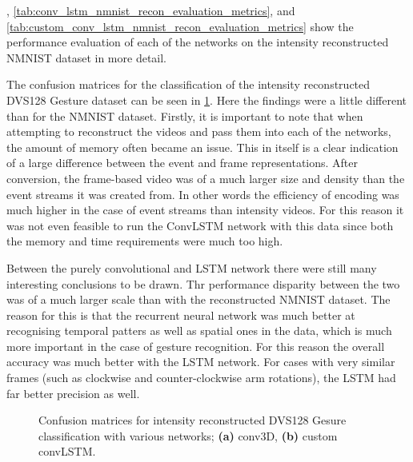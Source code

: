 , \cref{tab:conv_lstm_nmnist_recon_evaluation_metrics}, and \cref{tab:custom_conv_lstm_nmnist_recon_evaluation_metrics} show the performance evaluation of each of the networks on the intensity reconstructed NMNIST dataset in more detail.

\vspace{10pt}

The confusion matrices for the classification of the intensity reconstructed DVS128 Gesture dataset can be seen in \cref{fig:dvs128_recon_c_matrices}. Here the findings were a little different than for the NMNIST dataset. Firstly, it is important to note that when attempting to reconstruct the videos and pass them into each of the networks, the amount of memory often became an issue. This in itself is a clear indication of a large difference between the event and frame representations. After conversion, the frame-based video was of a much larger size and density than the event streams it was created from. In other words the efficiency of encoding was much higher in the case of event streams than intensity videos. For this reason it was not even feasible to run the ConvLSTM network with this data since both the memory and time requirements were much too high.

Between the purely convolutional and LSTM network there were still many interesting conclusions to be drawn. Thr performance disparity between the two was of a much larger scale than with the reconstructed NMNIST dataset. The reason for this is that the recurrent neural network was much better at recognising temporal patters as well as spatial ones in the data, which is much more important in the case of gesture recognition. For this reason the overall accuracy was much better with the LSTM network. For cases with very similar frames (such as clockwise and counter-clockwise arm rotations), the LSTM had far better precision as well.

\begin{figure}[htb]%
    \centering
    \qquad
    \caption{Confusion matrices for intensity reconstructed  DVS128 Gesure classification with various networks; \textbf{(a)} conv3D, \textbf{(b)} custom convLSTM.}%
    \label{fig:dvs128_recon_c_matrices}%
\end{figure}

